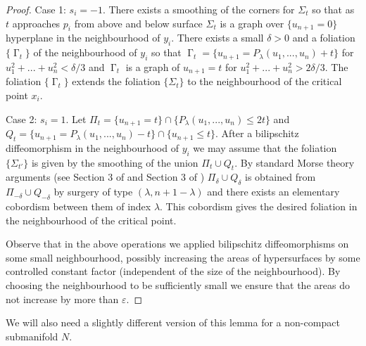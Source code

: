 \documentclass[12pt]{amsart}
\DeclareMathOperator{\G}{\Gamma}
\theoremstyle{definition}
\begin{document}
\begin{proof}
Case 1: $s_i  =-1$.
There exists a smoothing of the corners for $\Sigma_t$
so that 
as $t$ approaches $p_i$ from 
above and below
surface
$\Sigma_t$ is a graph over $\{ u_{n+1} =0 \}$ hyperplane
in the neighbourhood of $y_i$. 
There exists a small $\delta >0$ and a foliation $\{ \G_t \}$
of the neighbourhood of $y_i$ so that
$\G_t = \{u_{n+1} = P_{\lambda}(u_1,...,u_n) + t \}$ 
for $u_1^2+...+u_n^2< \delta/3$ and
$\G_t$ is a graph of $u_{n+1} = t$ 
for $u_1^2+...+u_n^2> 2 \delta/3$.
The foliation $\{ \G_t \}$ extends the foliation
$\{ \Sigma_t \}$ to the neighbourhood of 
the critical point $x_i$.

Case 2: $s_i  =1$.
Let $\Pi_t= \{u_{n+1} = t \} \cap
\{P_{\lambda}(u_1,...,u_n) \leq 2t \}$
and $Q_t = \{u_{n+1} = P_{\lambda}(u_1,...,u_n) - t \} \cap
\{u_{n+1} \leq t \}$.
After a bilipschitz diffeomorphism in the neighbourhood
of $y_i$ we may assume that the foliation $\{ \Sigma_{t'} \}$
is given by the smoothing of the union
$\Pi_t \cup Q_t$.
By standard Morse theory arguments (see Section 3 of \cite{Mi1}
and Section 3 of \cite{Mi2}) $\Pi_{\delta} \cup Q_{\delta}$
is obtained from $\Pi_{-\delta} \cup Q_{-\delta}$
by surgery of type $(\lambda, n+1-\lambda)$ and
there exists an elementary cobordism between them
of index $\lambda$.
This cobordism gives the desired foliation in the neighbourhood 
of the critical point. 

Observe that in the above operations we applied
bilipschitz diffeomorphisms on some small neighbourhood,
possibly increasing the areas of hypersurfaces
by some controlled constant factor 
(independent of
the size of the neighbourhood). By choosing the neighbourhood 
to be sufficiently small we ensure that the areas 
do not increase by more than $\varepsilon$.


\end{proof}

We will also need a slightly different
version of this lemma for a non-compact 
submanifold $N$.
\end{document}

